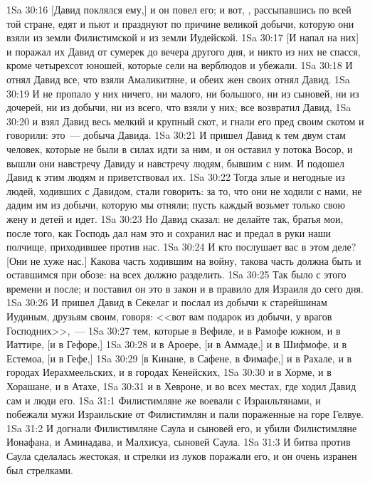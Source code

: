 \vs 1Sa 30:16 [Давид поклялся ему,] и он повел его; и вот, , рассыпавшись по всей той стране, едят и пьют и празднуют по причине великой добычи, которую они взяли из земли Филистимской и из земли Иудейской.
\vs 1Sa 30:17 [И напал на них] и поражал их Давид от сумерек до вечера другого дня, и никто из них не спасся, кроме четырехсот юношей, которые сели на верблюдов и убежали.
\vs 1Sa 30:18 И отнял Давид все, что взяли Амаликитяне, и обеих жен своих отнял Давид.
\vs 1Sa 30:19 И не пропало у них ничего, ни малого, ни большого, ни из сыновей, ни из дочерей, ни из добычи, ни из всего, что  взяли у них; все возвратил Давид,
\vs 1Sa 30:20 и взял Давид весь мелкий и крупный скот, и гнали его пред своим скотом и говорили: это~--- добыча Давида.
\vs 1Sa 30:21 И пришел Давид к тем двум стам человек, которые не были в силах идти за ним, и  он оставил у потока Восор, и вышли они навстречу Давиду и навстречу людям, бывшим с ним. И подошел Давид к этим людям и приветствовал их.
\vs 1Sa 30:22 Тогда злые и негодные из людей, ходивших с Давидом, стали говорить: за то, что они не ходили с нами, не дадим им из добычи, которую мы отняли; пусть каждый возьмет только свою жену и детей и идет.
\vs 1Sa 30:23 Но Давид сказал: не делайте так, братья мои, после того, как Господь дал нам это и сохранил нас и предал в руки наши полчище, приходившее против нас.
\vs 1Sa 30:24 И кто послушает вас в этом деле? [Они не хуже нас.] Какова часть ходившим на войну, такова часть должна быть и оставшимся при обозе: на всех должно разделить.
\vs 1Sa 30:25 Так было с этого времени и после; и поставил он это в закон и в правило для Израиля до сего дня.
\rsbpar\vs 1Sa 30:26 И пришел Давид в Секелаг и послал из добычи к старейшинам Иудиным, друзьям своим, говоря: <<вот вам подарок из добычи,  у врагов Господних>>,~---
\vs 1Sa 30:27 тем, которые в Вефиле, и в Рамофе южном, и в Иаттире, [и в Гефоре,]
\vs 1Sa 30:28 и в Ароере, [и в Аммаде,] и в Шифмофе, и в Естемоа, [и в Гефе,]
\vs 1Sa 30:29 [в Кинане, в Сафене, в Фимафе,] и в Рахале, и в городах Иерахмеельских, и в городах Кенейских,
\vs 1Sa 30:30 и в Хорме, и в Хорашане, и в Атахе,
\vs 1Sa 30:31 и в Хевроне, и во всех местах, где ходил Давид сам и люди его.
\vs 1Sa 31:1 Филистимляне же воевали с Израильтянами, и побежали мужи Израильские от Филистимлян и пали пораженные на горе Гелвуе.
\vs 1Sa 31:2 И догнали Филистимляне Саула и сыновей его, и убили Филистимляне Ионафана, и Аминадава, и Малхисуа, сыновей Саула.
\vs 1Sa 31:3 И битва против Саула сделалась жестокая, и стрелки из луков поражали его, и он очень изранен был стрелками.
